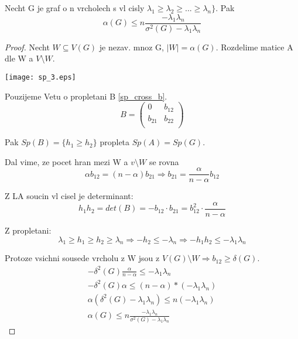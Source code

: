 \begin{theorem}
	Necht G je graf o n vrcholech s vl cisly $\lambda_1 \geq \lambda_2 \geq ... \geq \lambda_n \}$. Pak
	\[ \alpha(G) \leq n \frac{-\lambda_1\lambda_n}{\sigma^2(G) - \lambda_1\lambda_n} \]
\end{theorem}
\begin{proof}
	Necht $W \subseteq V(G)$ je nezav. mnoz G, $|W| = \alpha(G)$. Rozdelime matice A dle W a $V\setminus W$.

	\texttt{[image: sp\_3.eps]}

	Pouzijeme Vetu o propletani B \cref{sp_cross_b}.
	\[ B =
	\begin{pmatrix}
		0 & b_{12}\\
		b_{21} & b_{22}\\
	\end{pmatrix}
	\]

	Pak $Sp(B) = \{ h_1 \geq h_2 \}$ propleta $Sp(A) = Sp(G)$.

	Dal vime, ze pocet hran mezi W a $v\setminus W$ se rovna
	\[ \alpha b_{12} = (n - \alpha) b_{21} \Rightarrow b_{21} = \frac{\alpha}{n - \alpha} b_{12}\]

	Z LA soucin vl cisel je determinant:
	\[ h_1h_2 = det(B) = -b_{12} \cdot b_{21} = b_{12}^2 \cdot \frac{\alpha}{n - \alpha}\]

	Z propletani:
	\[ \lambda_1 \geq h_1 \geq h_2 \geq \lambda_n \Rightarrow -h_2 \leq -\lambda_n \Rightarrow -h_1h_2 \leq -\lambda_1 \lambda_n \]

	Protoze vsichni sousede vrcholu z W jsou z $V(G) \setminus W \Rightarrow b_{12} \geq \delta(G)$.
	\begin{gather*}
	-\delta^2(G) \frac{\alpha}{n - \alpha} \leq -\lambda_1 \lambda_n\\
	-\delta^2(G) \alpha \leq (n - \alpha) * (-\lambda_1 \lambda_n)\\
	\alpha(\delta^2(G) - \lambda_1 \lambda_n) \leq n(-\lambda_1 \lambda_n)\\
	\alpha(G) \leq n \frac{-\lambda_1\lambda_n}{\sigma^2(G) - \lambda_1\lambda_n}
	\end{gather*}
\end{proof}

